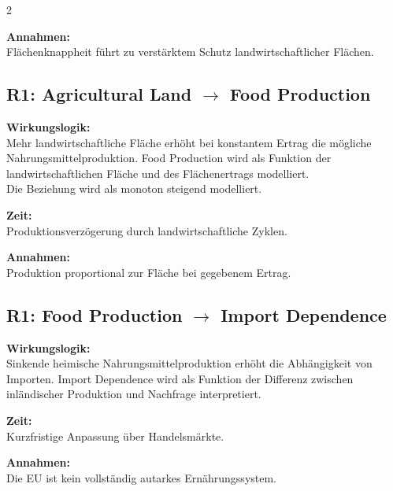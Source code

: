 \documentclass[10pt, a4paper]{article}
\begin{document}
\begin{multicols}{2}
\begin{minipage}{\linewidth}
\textbf{Annahmen:}\\
Flächenknappheit führt zu verstärktem Schutz landwirtschaftlicher Flächen.
\end{minipage}\vspace{1em}

\begin{minipage}{\linewidth}
\subsection*{R1: Agricultural Land $\rightarrow$ Food Production}

\textbf{Wirkungslogik:}\\
Mehr landwirtschaftliche Fläche erhöht bei konstantem Ertrag die mögliche Nahrungsmittelproduktion.
Food Production wird als Funktion der landwirtschaftlichen Fläche und des Flächenertrags modelliert. \\
Die Beziehung wird als monoton steigend modelliert.

\textbf{Zeit:}\\
Produktionsverzögerung durch landwirtschaftliche Zyklen.

\textbf{Annahmen:}\\
Produktion proportional zur Fläche bei gegebenem Ertrag.
\end{minipage}\vspace{1em}

\begin{minipage}{\linewidth}
\subsection*{R1: Food Production $\rightarrow$ Import Dependence}

\textbf{Wirkungslogik:}\\
Sinkende heimische Nahrungsmittelproduktion erhöht die Abhängigkeit von Importen.
Import Dependence wird als Funktion der Differenz zwischen inländischer Produktion und Nachfrage interpretiert.

\textbf{Zeit:}\\
Kurzfristige Anpassung über Handelsmärkte.

\textbf{Annahmen:}\\
Die EU ist kein vollständig autarkes Ernährungssystem.
\end{minipage}\vspace{1em}

\begin{minipage}{\linewidth}

\end{minipage}
\end{multicols}
\end{document}
